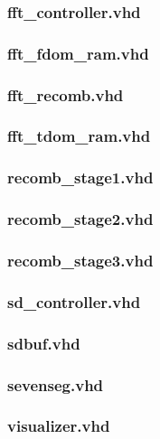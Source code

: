 \documentclass{article}
\begin{document}
	\subsubsection{fft\_controller.vhd}
	
	\subsubsection{fft\_fdom\_ram.vhd}
	
	\subsubsection{fft\_recomb.vhd}
	
	\subsubsection{fft\_tdom\_ram.vhd}
	
	\subsubsection{recomb\_stage1.vhd}
	
	\subsubsection{recomb\_stage2.vhd}
	
	\subsubsection{recomb\_stage3.vhd}
	
	\subsubsection{sd\_controller.vhd}
	
	\subsubsection{sdbuf.vhd}
	
	\subsubsection{sevenseg.vhd}
	
	\subsubsection{visualizer.vhd}
	
\end{document}
